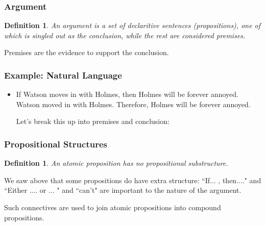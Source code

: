 \documentclass{beamer}
\theoremstyle{indentDefn} \newtheorem{defn}[]{Definition}
\begin{document}

\begin{frame}
	\frametitle{Argument}
	

	\begin{defn}
		An argument is a set of declaritive sentences (propositions), one of which is singled out as the conclusion, while the rest are considered premises. 
	\end{defn}
		 
	\vspace{0.5cm}
	
	Premises are the evidence to support the conclusion.
	

\end{frame}

\begin{frame}
	\frametitle{Example: Natural Language}
	
	\begin{itemize}
		\item If Watson moves in with Holmes, then Holmes will be forever annoyed. Watson moved in with Holmes. Therefore, Holmes will be forever annoyed.

		\vspace{0.5cm}

		Let's break this up into premises and conclusion: 
		
		\vspace{5cm}
		
		
	\end{itemize}
\end{frame}

\begin{frame}
	\frametitle{Propositional Structures}
	
	\begin{defn} 
		
		An atomic proposition has no propositional substructure.
		
	\end{defn}


	
	We saw above that some propositions do have extra structure: ``If... , then...." and ``Either .... or ... " and ``can't" are important to the nature of the argument. 
	
	\vspace{0.5cm}
	
	Such connectives are used to join atomic propositions into compound propositions.
	
	
	
\end{frame}
\end{document}
